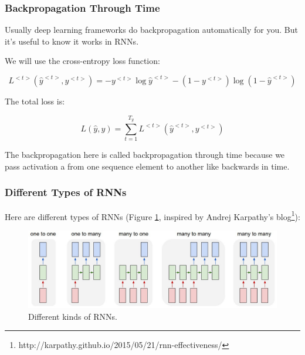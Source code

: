 \subsubsection{Backpropagation Through Time}
Usually deep learning frameworks do backpropagation automatically for you. But it's useful to know it works in RNNs.

We will use the cross-entropy loss function:

\begin{equation}
    L^{<t>}(\hat{y}^{<t>}, y^{<t>}) = - y^{<t>}\log \hat{y}^{<t>} - (1 - y^{<t>}) \log (1 - \hat{y}^{<t>})
\end{equation}

The total loss is:

\begin{equation}
    L(\hat{y}, y) = \sum_{t=1}^{T_y} L^{<t>}(\hat{y}^{<t>}, y^{<t>})
\end{equation}

The backpropagation here is called backpropagation through time because we pass activation a from one sequence element to another like backwards in time.


\subsubsection{Different Types of RNNs}
Here are different types of RNNs (Figure \ref{diff-rnns}, inspired by Andrej Karpathy's blog\footnote{http://karpathy.github.io/2015/05/21/rnn-effectiveness/}):

\begin{figure}[!htbp]
    \centering
    \includegraphics[width=1.0\textwidth]{img/c5/diff-rnns.jpg}
    \caption{Different kinds of RNNs.}
    \label{diff-rnns}
\end{figure}

